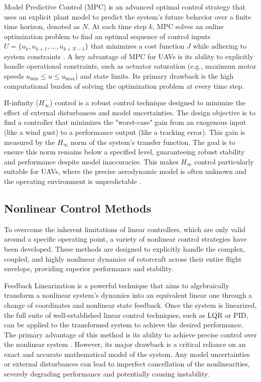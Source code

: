 Model Predictive Control (MPC) is an advanced optimal control strategy that uses an explicit plant model to predict the system's future behavior over a finite time horizon, denoted as $N$. At each time step $k$, MPC solves an online optimization problem to find an optimal sequence of control inputs $U = \{u_k, u_{k+1}, \dots, u_{k+N-1}\}$ that minimizes a cost function $J$ while adhering to system constraints  \cite{mpc1,mpc2}. A key advantage of MPC for UAVs is its ability to explicitly handle operational constraints, such as actuator saturation (e.g., maximum motor speeds $u_{\min} \le u \le u_{\max}$) and state limits. Its primary drawback is the high computational burden of solving the optimization problem at every time step.

H-infinity ($H_{\infty}$) control is a robust control technique designed to minimize the effect of external disturbances and model uncertainties. The design objective is to find a controller that minimizes the "worst-case" gain from an exogenous input (like a wind gust) to a performance output (like a tracking error). This gain is measured by the $H_{\infty}$ norm of the system's transfer function. The goal is to ensure this norm remains below a specified level, guaranteeing robust stability and performance despite model inaccuracies. This makes $H_{\infty}$ control particularly suitable for UAVs, where the precise aerodynamic model is often unknown and the operating environment is unpredictable  \cite{hinf1,hinf2,hinf3}.

\subsection{Nonlinear Control Methods}
To overcome the inherent limitations of linear controllers, which are only valid around a specific operating point, a variety of nonlinear control strategies have been developed. These methods are designed to explicitly handle the complex, coupled, and highly nonlinear dynamics of rotorcraft across their entire flight envelope, providing superior performance and stability.

Feedback Linearization is a powerful technique that aims to algebraically transform a nonlinear system's dynamics into an equivalent linear one through a change of coordinates and nonlinear state feedback. Once the system is linearized, the full suite of well-established linear control techniques, such as LQR or PID, can be applied to the transformed system to achieve the desired performance. The primary advantage of this method is its ability to achieve precise control over the nonlinear system  \cite{fbl1,fbl2,fbl3}. However, its major drawback is a critical reliance on an exact and accurate mathematical model of the system. Any model uncertainties or external disturbances can lead to imperfect cancellation of the nonlinearities, severely degrading performance and potentially causing instability.

